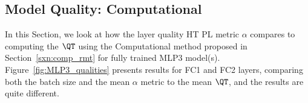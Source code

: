 \subsection{Model Quality: Computational \RTransforms}
\label{sxn:empirical_comp_r_transforms}

In this Section, we look at how the \HTSR layer quality HT PL metric $\alpha$
compares to computing the \LayerQualitySquared $\QT$ using
the Computational \RTransform method proposed in Section~\ref{sxn:comp_rmt}
for fully trained MLP3 model(s).
Figure~\ref{fig:MLP3_qualities}
presents results for FC1 and FC2 layers, comparing
both the batch size and the mean $\alpha$ metric to the
mean $\QT$, and the results are quite different.


\begin{figure}[t]
    \centering
    \hspace{1cm} %
    \hspace{1cm} %
\end{figure}
